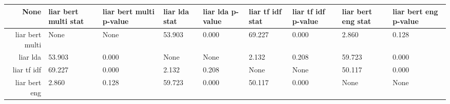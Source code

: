 \begin{tabular}{|r|l|l|l|l|l|l|l|l|}
  \hline
  None & liar bert multi stat & liar bert multi p-value & liar lda stat & liar lda p-value & liar tf idf stat & liar tf idf p-value & liar bert eng stat & liar bert eng p-value \\ 
  \hline
  liar bert multi & None & None & 53.903 & 0.000 & 69.227 & 0.000 & 2.860 & 0.128 \\ 
  \hline
  liar lda & 53.903 & 0.000 & None & None & 2.132 & 0.208 & 59.723 & 0.000 \\ 
  \hline
  liar tf idf & 69.227 & 0.000 & 2.132 & 0.208 & None & None & 50.117 & 0.000 \\ 
  \hline
  liar bert eng & 2.860 & 0.128 & 59.723 & 0.000 & 50.117 & 0.000 & None & None \\ 
  \hline
\end{tabular}

